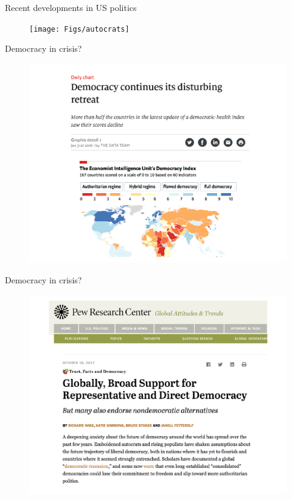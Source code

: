 \documentclass[10pt]{beamer}
\begin{document}
\begin{frame}{Recent developments in US politics}
	\begin{figure}
	\centering
	\texttt{[image: Figs/autocrats]}
	\end{figure}
\end{frame}

\begin{frame}{Democracy in crisis?}
	\begin{figure}
	\centering
	\includegraphics[scale=0.38]{Figs/democracy_retreat}
	\end{figure}
\end{frame}

\begin{frame}{Democracy in crisis?}
	\begin{figure}
	\centering
	\includegraphics[scale=0.38]{Figs/democracy_support}
	\end{figure}
\end{frame}
\end{document}
